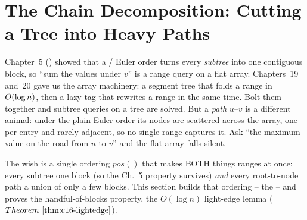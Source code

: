\section{The Chain Decomposition: Cutting a Tree into Heavy Paths}\label{sec:c16-decomp}

\begin{previouslybox}
Chapter~5 () showed that a / Euler order turns every \emph{subtree} into one contiguous block, so ``sum the values under \(v\)'' is a range query on a flat array.  Chapters~19 and~20 gave us the array machinery: a segment tree that folds a range in \(O(\log n)\), then a lazy tag that rewrites a range in the same time.  Bolt them together and subtree queries on a tree are solved.  But a \emph{path} \(u\)--\(v\) is a different animal: under the plain Euler order its nodes are scattered across the array, one per entry and rarely adjacent, so no single range captures it.  Ask ``the maximum value on the road from \(u\) to \(v\)'' and the flat array falls silent.

The wish is a single ordering \(\mathit{pos}()\) that makes BOTH things ranges at once: every subtree one block (so the Ch.~5 property survives) \emph{and} every root-to-node path a union of only a few blocks.  This section builds that ordering -- the  -- and proves the handful-of-blocks property, the \(O(\log n)\) light-edge lemma (\(\thmref{c16-lightedge}\)).
\end{previouslybox}

